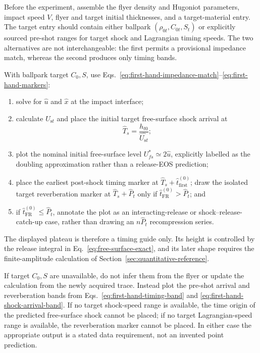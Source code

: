\documentclass[11pt]{article}
\newcommand{\rhoz}[1][]{\rho_{0#1}}
\newcommand{\Us}[1][]{U_{\mathrm{s}#1}}
\begin{document}
Before the experiment, assemble the flyer density and Hugoniot parameters,
impact speed $V$, flyer and target initial thicknesses, and a target-material
entry.  The target entry should contain either ballpark
$(\rhoz[t],C_{0t},S_t)$ or explicitly sourced pre-shot ranges for target shock
and Lagrangian timing speeds.  The two alternatives are not interchangeable:
the first permits a provisional impedance match, whereas the second produces
only timing bands.

With ballpark target $C_0,S$, use
Eqs.~\eqref{eq:first-hand-impedance-match}--\eqref{eq:first-hand-markers}:
\begin{enumerate}
  \item solve for $\widehat u$ and $\widehat x$ at the impact interface;
  \item calculate $\widehat{\Us[t]}$ and place the initial target
        free-surface shock arrival at
        \begin{equation}
          \widehat T_s=\frac{h_{t0}}{\widehat{\Us[t]}} ;
          \label{eq:pre-shot-shock-arrival}
        \end{equation}
  \item plot the nominal initial free-surface level
        $U_{fs}^{\ast}\simeq2\widehat u$, explicitly labelled as the
        doubling approximation rather than a release-EOS prediction;
  \item place the earliest post-shock timing marker at
        $\widehat T_s+\widehat t_{\mathrm{first}}^{(0)}$;
        draw the isolated target reverberation marker at
        $\widehat T_s+\widehat P_t$ only if
        $\widehat t_{\mathrm{FR}}^{(0)}>\widehat P_t$; and
  \item if $\widehat t_{\mathrm{FR}}^{(0)}\leq\widehat P_t$, annotate the
        plot as an interacting-release or shock--release-catch-up case,
        rather than drawing an $n\widehat P_t$ recompression series.
\end{enumerate}
The displayed plateau is therefore a timing guide only.  Its height is
controlled by the release integral in Eq.~\eqref{eq:free-surface-exact}, and
its later shape requires the finite-amplitude calculation of
Section~\ref{sec:quantitative-reference}.

If target $C_0,S$ are unavailable, do not infer them from the flyer or update
the calculation from the newly acquired trace.  Instead plot the pre-shot
arrival and reverberation bands from
Eqs.~\eqref{eq:first-hand-timing-band} and
\eqref{eq:first-hand-shock-arrival-band}.  If no target shock-speed range is
available, the time origin of the predicted free-surface shock cannot be
placed; if no target Lagrangian-speed range is available, the reverberation
marker cannot be placed.  In either case the appropriate output is a stated
data requirement, not an invented point prediction.
\end{document}
